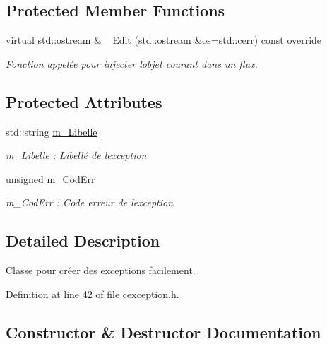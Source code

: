 \subsection*{Protected Member Functions}
\begin{DoxyCompactItemize}
\item 
virtual std\+::ostream \& \hyperlink{classns_exception_1_1_c_exception_a6416e24189687d875f3e92b10d6bd516}{\+\_\+\+Edit} (std\+::ostream \&os=std\+::cerr) const override
\begin{DoxyCompactList}\small\item\em Fonction appelée pour injecter l\textquotesingle{}objet courant dans un flux. \end{DoxyCompactList}\end{DoxyCompactItemize}
\subsection*{Protected Attributes}
\begin{DoxyCompactItemize}
\item 
std\+::string \hyperlink{classns_exception_1_1_c_exception_a96c2d653703b2879ff8050cc78bc450a}{m\+\_\+\+Libelle}
\begin{DoxyCompactList}\small\item\em m\+\_\+\+Libelle \+: Libellé de l\textquotesingle{}exception \end{DoxyCompactList}\item 
unsigned \hyperlink{classns_exception_1_1_c_exception_a9610371f15e2c6d99034c46b632d51da}{m\+\_\+\+Cod\+Err}
\begin{DoxyCompactList}\small\item\em m\+\_\+\+Cod\+Err \+: Code erreur de l\textquotesingle{}exception \end{DoxyCompactList}\end{DoxyCompactItemize}


\subsection{Detailed Description}
Classe pour créer des exceptions facilement. 

Definition at line 42 of file cexception.\+h.



\subsection{Constructor \& Destructor Documentation}
\mbox{\label{classns_exception_1_1_c_exception_aeacba2e2180dd8c00c643e1a67cba423}} 
